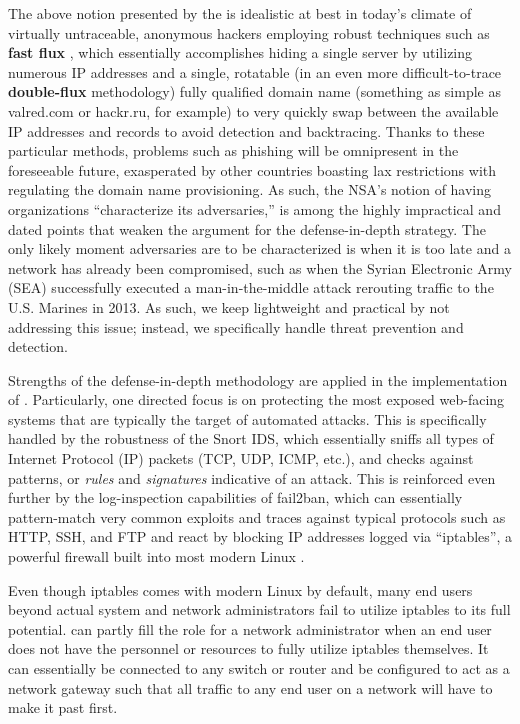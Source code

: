 \documentclass[12pt,letterpaper,titlepage]{report}
\begin{document}
{The above notion presented by the \nsa is idealistic at best in today's climate
of virtually untraceable, anonymous hackers employing robust \dns
techniques such as \textbf{fast flux} \autocite{honey}, which essentially accomplishes hiding a
single \ctwo server by utilizing numerous IP addresses and a
single, rotatable (in an even more difficult-to-trace \textbf{double-flux} methodology)
fully qualified domain name (something as simple as valred.com or hackr.ru, for
example) to very quickly swap between the available IP addresses and \dns records
to avoid detection and backtracing.  Thanks to these particular methods,
problems such as phishing will be omnipresent in the foreseeable future,
exasperated by other countries boasting lax restrictions with regulating the
domain name provisioning.  As such, the NSA’s notion of having organizations
``characterize its adversaries,'' is among the highly impractical and dated points
that weaken the argument for the defense-in-depth strategy.  The only likely
moment adversaries are to be characterized is when it is too late and a network
has already been compromised, such as when the Syrian Electronic Army (SEA)
successfully executed a man-in-the-middle attack rerouting traffic to the U.S.
Marines \autocite{syrians} in 2013.  As such, we keep \scarletshield lightweight and practical
by not addressing this issue; instead, we specifically handle threat prevention
and detection.

Strengths of the defense-in-depth methodology are applied in the implementation
of \scarletshield.  Particularly, one directed focus is on protecting the most
exposed web-facing systems that are typically the target of automated attacks.
This is specifically handled by the robustness of the Snort IDS, which
essentially sniffs all types of Internet Protocol (IP) packets (TCP, UDP, ICMP,
etc.), and checks against patterns, or \emph{rules} and \emph{signatures} indicative of an
attack.  This is reinforced even further by the log-inspection capabilities of
fail2ban, which can essentially pattern-match very common exploits and \dos
traces against typical protocols such as HTTP, SSH, and FTP and react by
blocking IP addresses logged via ``iptables'', a powerful firewall built into most
modern Linux \distros.

Even though iptables comes with modern Linux \distros by default, many end users
beyond actual system and network administrators fail to utilize iptables to its
full potential.  \scarletshield can partly fill the role for a network
administrator when an end user does not have the personnel or resources to fully
utilize iptables themselves.  It can essentially be connected to any switch or
router and be configured to act as a network gateway such that all traffic to
any end user on a network will have to make it past \scarletshield first.

}
\end{document}
